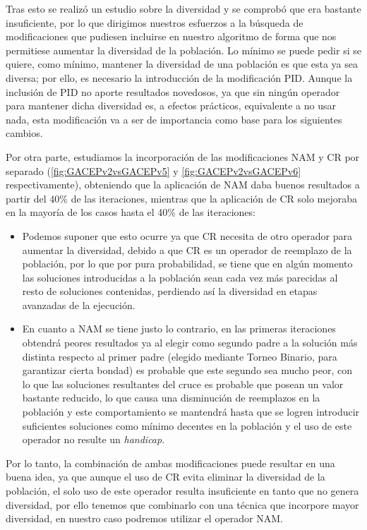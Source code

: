 Tras esto se realizó un estudio sobre la diversidad y se comprobó que era bastante insuficiente, por lo que dirigimos nuestros esfuerzos a la búsqueda de modificaciones que pudiesen incluirse en nuestro algoritmo de forma que nos permitiese aumentar la diversidad de la población. 
Lo mínimo se puede pedir si se quiere, como mínimo, mantener la diversidad de una población es que esta ya sea diversa; por ello, es necesario la introducción de la modificación PID. 
Aunque la inclusión de PID no aporte resultados novedosos, ya que sin ningún operador para mantener dicha diversidad es, a efectos prácticos, equivalente a no usar nada, esta modificación va a ser de importancia como base para los siguientes cambios. 

Por otra parte, estudiamos la incorporación de las modificaciones NAM y CR por separado (\ref{fig:GACEPv2vsGACEPv5} y \ref{fig:GACEPv2vsGACEPv6} respectivamente), obteniendo que la aplicación de NAM daba buenos resultados a partir del 40\% de las iteraciones, mientras que la aplicación de CR solo mejoraba en la mayoría de los casos hasta el 40\% de las iteraciones: 
\begin{itemize}
	\item Podemos suponer que esto ocurre ya que CR necesita de otro operador para aumentar la diversidad, debido a que CR es un operador de reemplazo de la población, por lo que por pura probabilidad, se tiene que en algún momento las soluciones introducidas a la población sean cada vez más parecidas al resto de soluciones contenidas, perdiendo así la diversidad en etapas avanzadas de la ejecución.
	
	\item En cuanto a NAM se tiene justo lo contrario, en las primeras iteraciones obtendrá peores resultados ya al elegir como segundo padre a la solución más distinta respecto al primer padre (elegido mediante Torneo Binario, para garantizar cierta bondad) es probable que este segundo sea mucho peor, con lo que las soluciones resultantes del cruce es probable que posean un valor bastante reducido, lo que causa una disminución de reemplazos en la población y este comportamiento se mantendrá hasta que se logren introducir suficientes soluciones como mínimo decentes en la población y el uso de este operador no resulte un \textit{handicap}. 
\end{itemize} 
Por lo tanto, la combinación de ambas modificaciones puede resultar en una buena idea, ya que aunque el uso de CR evita eliminar la diversidad de la población, el solo uso de este operador resulta insuficiente en tanto que no genera diversidad, por ello tenemos que combinarlo con una técnica que incorpore mayor diversidad, en nuestro caso podremos utilizar el operador NAM. 

